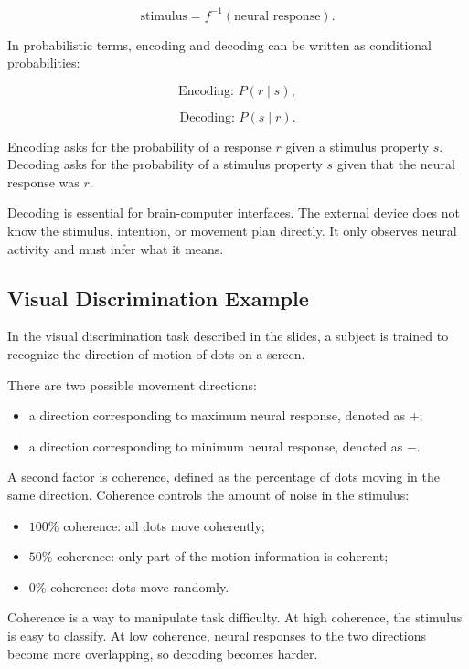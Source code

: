 \[
\text{stimulus} = f^{-1}(\text{neural response}).
\]

In probabilistic terms, encoding and decoding can be written as conditional probabilities:

\[
\text{Encoding: } P(r \mid s),
\]

\[
\text{Decoding: } P(s \mid r).
\]

Encoding asks for the probability of a response $r$ given a stimulus property $s$. Decoding asks for the probability of a stimulus property $s$ given that the neural response was $r$.

\begin{authornote}
Decoding is essential for brain-computer interfaces. The external device does not know the stimulus, intention, or movement plan directly. It only observes neural activity and must infer what it means.
\end{authornote}

\subsection{Visual Discrimination Example}

In the visual discrimination task described in the slides, a subject is trained to recognize the direction of motion of dots on a screen.

There are two possible movement directions:

\begin{itemize}[noitemsep]
    \item a direction corresponding to maximum neural response, denoted as $+$;
    \item a direction corresponding to minimum neural response, denoted as $-$.
\end{itemize}

A second factor is coherence, defined as the percentage of dots moving in the same direction. Coherence controls the amount of noise in the stimulus:

\begin{itemize}[noitemsep]
    \item $100\%$ coherence: all dots move coherently;
    \item $50\%$ coherence: only part of the motion information is coherent;
    \item $0\%$ coherence: dots move randomly.
\end{itemize}

\begin{authornote}
Coherence is a way to manipulate task difficulty. At high coherence, the stimulus is easy to classify. At low coherence, neural responses to the two directions become more overlapping, so decoding becomes harder.
\end{authornote}

